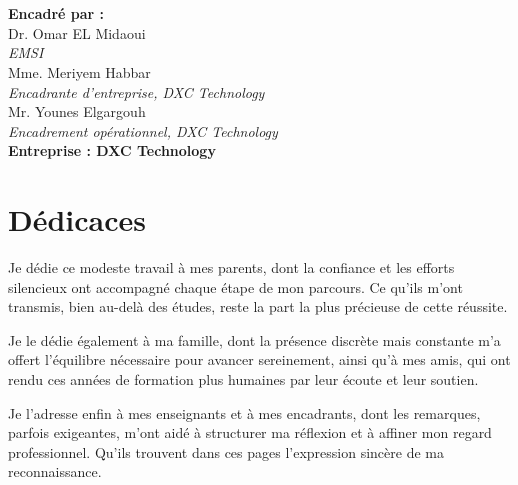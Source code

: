 \documentclass[12pt,a4paper]{report}
\begin{document}
\begin{titlepage}
    \vfill
    \begin{minipage}{0.42\textwidth}
        \raggedright
        \hspace{1.1cm}{\large\bfseries Réalisé par :}\\[0.25cm]
        \hspace{1.1cm}{\large Mahdi Mansour}\\[0.55cm]
        \hspace{1.1cm}{\normalsize Année universitaire : 2025--2026}
    \end{minipage}
    \hfill
    \begin{minipage}{0.52\textwidth}
        \raggedright
        {\large\bfseries Encadré par :}\\[0.25cm]
        {\large Dr. Omar EL Midaoui}\\
        {\normalsize\itshape EMSI}\\[0.18cm]
        {\large Mme. Meriyem Habbar}\\
        {\normalsize\itshape Encadrante d'entreprise, DXC Technology}\\[0.18cm]
        {\large Mr. Younes Elgargouh}\\
        {\normalsize\itshape Encadrement opérationnel, DXC Technology}\\[0.35cm]
        {\large\bfseries Entreprise : DXC Technology}
    \end{minipage}
    \vspace*{0.6cm}
\end{titlepage}
\onehalfspacing

\chapter*{Dédicaces}
Je dédie ce modeste travail à mes parents, dont la confiance et les efforts silencieux ont accompagné chaque étape de mon parcours. Ce qu'ils m'ont transmis, bien au-delà des études, reste la part la plus précieuse de cette réussite.

Je le dédie également à ma famille, dont la présence discrète mais constante m'a offert l'équilibre nécessaire pour avancer sereinement, ainsi qu'à mes amis, qui ont rendu ces années de formation plus humaines par leur écoute et leur soutien.

Je l'adresse enfin à mes enseignants et à mes encadrants, dont les remarques, parfois exigeantes, m'ont aidé à structurer ma réflexion et à affiner mon regard professionnel. Qu'ils trouvent dans ces pages l'expression sincère de ma reconnaissance.
\end{document}
